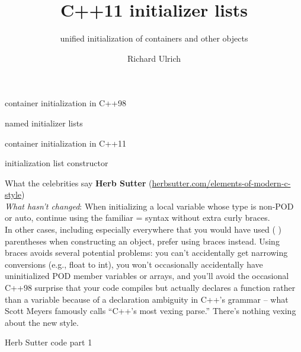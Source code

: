\documentclass[11pt]{beamer}
\author{Richard Ulrich}
\title{C++11 initializer lists}
\subtitle{unified initialization of containers and other objects}
\institute{cubx Software AG}
\begin{document}
\begin{frame}
\titlepage
\end{frame}


\begin{frame}{container initialization in C++98}

\end{frame}

\begin{frame}{named initializer lists}

\end{frame}

\begin{frame}{container initialization in C++11}

\end{frame}

\begin{frame}{initialization list constructor}

\end{frame}

\begin{frame}{What the celebrities say}
\textbf{Herb Sutter} (\href{http://herbsutter.com/elements-of-modern-c-style}{herbsutter.com/elements-of-modern-c-style})\\

\emph{What hasn’t changed}: When initializing a local variable whose type is non-POD or auto, continue using the familiar = syntax without extra curly braces.\\
In other cases, including especially everywhere that you would have used ( ) parentheses when constructing an object, prefer using { } braces instead. Using braces avoids several potential problems: you can’t accidentally get narrowing conversions (e.g., float to int), you won’t occasionally accidentally have uninitialized POD member variables or arrays, and you’ll avoid the occasional C++98 surprise that your code compiles but actually declares a function rather than a variable because of a declaration ambiguity in C++’s grammar – what Scott Meyers famously calls “C++’s most vexing parse.” There’s nothing vexing about the new style.
\end{frame}

\begin{frame}{Herb Sutter code part 1}

\end{frame}
\end{document}
